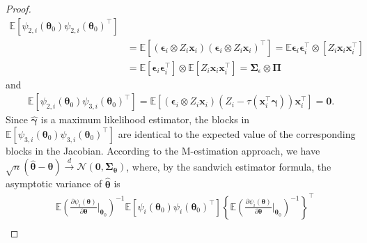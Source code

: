 \documentclass[10pt,a4paper]{amsart}
\newcommand{\IdenMat}{\textbf{I}}
\newcommand{\LogCoe}{\boldsymbol{\gamma}}
\newcommand{\ObsCov}{\textbf{x}_i}
\begin{document}
\begin{proof}
\begin{align*}
                \mathbb{E} [ \psi_{2,i}(\boldsymbol{\theta}_0) \psi_{2,i}(\boldsymbol{\theta}_0)^{\top} ] \\
                &= \mathbb{E} \left[  (\boldsymbol{\epsilon}_i\otimes Z_i\ObsCov) (\boldsymbol{\epsilon}_i\otimes Z_i\ObsCov)^{\top} \right]
                = \mathbb{E}  \boldsymbol{\epsilon}_i\boldsymbol{\epsilon}_i^{\top} \otimes \left[ Z_i\ObsCov\ObsCov^{\top}  \right] \\
                &=\mathbb{E}\left[\boldsymbol{\epsilon}_i\boldsymbol{\epsilon}_i^{\top} \right] \otimes \mathbb{E} \left[Z_i \ObsCov\ObsCov^{\top}\right] 
                =   \boldsymbol{\Sigma}_{\epsilon} \otimes \boldsymbol{\Pi} 
            \end{align*}
        and 
            \begin{align*}
                \mathbb{E} [ \psi_{2,i}(\boldsymbol{\theta}_0) \psi_{3,i}(\boldsymbol{\theta}_0)^{\top} ] 
                =  \mathbb{E} \left[  ( \boldsymbol{\epsilon}_i \otimes Z_i\ObsCov ) (Z_i - \tau(\ObsCov^{\top} \LogCoe))\ObsCov^{\top} \right] = \textbf{0}.
            \end{align*}
        Since $\hat{\LogCoe}$ is a maximum likelihood estimator, the blocks in $\mathbb{E} [ \psi_{3,i}(\boldsymbol{\theta}_0)\psi_{3,i}(\boldsymbol{\theta}_0)^{\top} ] $ are identical to the expected value of the corresponding blocks in the Jacobian.
        According to the M-estimation approach, we have $\sqrt{n}( \hat{\boldsymbol{\theta}} -\boldsymbol{\theta} ) \overset{d}{\rightarrow} \mathcal{N}(\textbf{0}, \boldsymbol{\Sigma_\theta})$,
        where, by the sandwich estimator formula, the asymptotic variance of $\hat{\boldsymbol{\theta}}$ is
            \begin{align*}
                &  \mathbb{E} \left( \frac{\partial \psi_i(\boldsymbol{\theta})}{ \partial \boldsymbol{\theta}} \biggr\rvert_{\boldsymbol{\theta}_0} \right)^{-1} 
                    \mathbb{E} [ \psi_i(\boldsymbol{\theta}_0)\psi_i(\boldsymbol{\theta}_0)^{\top} ]
                    \left\{ \mathbb{E} \left( \frac{\partial \psi_i(\boldsymbol{\theta})}{ \partial \boldsymbol{\theta}} \biggr\rvert_{\boldsymbol{\theta}_0} \right)^{-1} \right\}^{\top} \\

\end{align*}
\end{proof}
\end{document}
